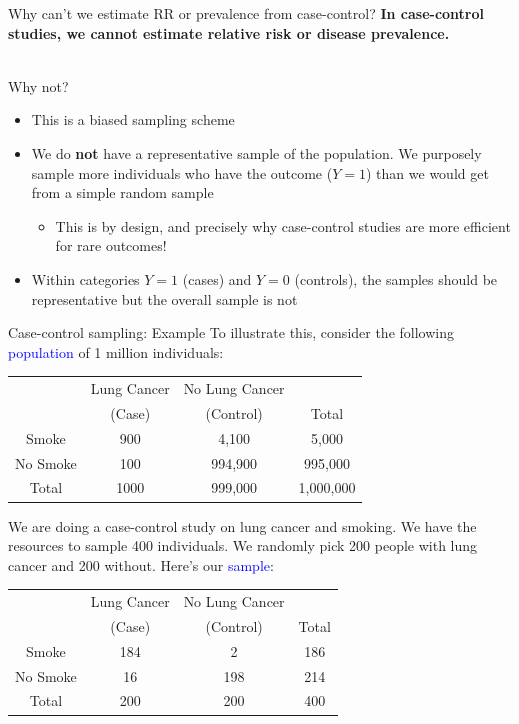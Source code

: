 \documentclass[10pt,t]{beamer}
\begin{document}
\begin{frame}{Why can't we estimate RR or prevalence from case-control?}
	\textbf{In case-control studies, we cannot estimate relative risk or disease prevalence.}
	\\ ~\
	
	Why not? 
	\begin{itemize}
		\item This is a biased sampling scheme
		\item We do \textbf{not} have a representative sample of the population. We purposely sample more individuals who have the outcome ($Y = 1$) than we would 
		get from a simple random sample
			\begin{itemize}
				\item This is by design, and precisely why case-control studies are more efficient for rare outcomes!
			\end{itemize}
		\item Within categories $Y = 1$ (cases) and $Y = 0$ (controls), the samples should be representative but the overall sample is not
	\end{itemize} 
\end{frame}

\begin{frame}{Case-control sampling: Example}
	\vspace{-0.3cm}
	To illustrate this, consider the following \textcolor{blue}{population} of 1 million individuals:
	\begin{center}
		\begin{table}
			\begin{tabular}{|c|cc|c|}
				\hline 
				& Lung Cancer & No Lung Cancer &  \\ 
				& (Case) & (Control) & Total  \\
				\hline 
				Smoke & 900 & 4,100  & 5,000 \\ 
				No Smoke & 100 & 994,900 & 995,000  \\ 
				\hline 
				Total & 1000 & 999,000 & 1,000,000 \\ 
				\hline 
			\end{tabular}
		\end{table}
	\end{center}\pause
	We are doing a case-control study on lung cancer and smoking. We have the resources to sample 400 individuals. We randomly pick 200 people with lung cancer and 200 without. Here's our \textcolor{blue}{sample}:
		\begin{center}
		\begin{table}
			\begin{tabular}{|c|cc|c|}
				\hline 
				& Lung Cancer & No Lung Cancer &  \\ 
				& (Case) & (Control) & Total  \\
				\hline 
				Smoke & 184 & 2  & 186 \\ 
				No Smoke & 16 & 198 & 214  \\ 
				\hline 
				Total & 200 & 200 & 400 \\ 
				\hline 
			\end{tabular}
		\end{table}
	\end{center}
\end{frame}
\end{document}
